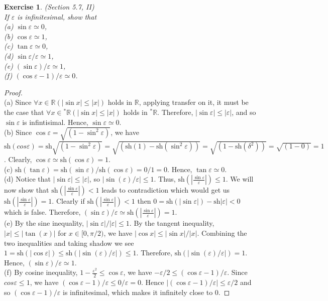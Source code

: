 \documentclass[a4paper, 11pt]{book}
\theoremstyle{plain}
\newtheorem{exercise}{Exercise}[chapter]
\theoremstyle{plain}
\newcommand{\R}{\mathbb{R}}
\newcommand{\ep}{\varepsilon}
\newcommand{\del}{\delta}
\newcommand{\hyp}{{}^*}
\newcommand{\sh}{\text{sh}}
\begin{document}
  \begin{exercise}
    (Section 5.7, II) \\
    If $\ep$ is infinitesimal, show that \\
    (a) $\sin \ep \simeq 0$, \\
    (b) $\cos \ep \simeq 1$, \\
    (c) $\tan \ep \simeq 0$, \\
    (d) $\sin \ep /\ep \simeq 1$, \\
    (e) $(\sin \ep)/\ep \simeq 1$,\\
    (f) $(\cos \ep -1)/\ep \simeq 0$.
  \end{exercise}
  \begin{proof} $ $ \\
    (a) Since $\forall x \in \R (|\sin x| \leq |x|)$ holds in $\R$, applying transfer on it, it must be the case that $\forall x \in \hyp \R (|\sin x| \leq |x|)$ holds in $\hyp \R$. Therefore, $|\sin \ep| \leq |\ep|$, and so $\sin \ep$ is infintisimal. Hence, $\sin \ep \simeq 0$. \\

    (b) Since $\cos \ep=\sqrt{(1-\sin^2 \ep)}$, we have $\sh (cos \ep)=\sh \sqrt{(1-\sin^2 \ep)}=\sqrt{(\sh(1)-\sh(\sin^2 \ep))}=\sqrt{(1-\sh(\del^2))}=\sqrt{(1-0)}=1$. Clearly, $\cos \ep \simeq \sh(\cos \ep)=1$. \\

    (c) $\sh (\tan \ep)=\sh(\sin \ep)/\sh( \cos \ep)=0/1=0$. Hence, $\tan \ep \simeq 0$. \\

    (d) Notice that $|\sin \ep| \leq |\ep|$, so $|\sin (\ep)/\ep| \leq 1$. Thus, $\sh \left( \left| \frac{\sin \ep}{\ep} \right| \right) \leq 1$. We will now show that $\sh \left( \left| \frac{\sin \ep}{\ep} \right| \right)<1$ leads to contradiction which would get us $\sh \left( \left| \frac{\sin \ep}{\ep} \right| \right)=1$. Clearly if $\sh \left( \left| \frac{\sin \ep}{\ep} \right| \right)<1$ then $0=\sh(|\sin \ep|)-\sh|\ep|<0$ which is false. Therefore, $(\sin \ep)/\ep \simeq \sh \left( \left| \frac{\sin \ep}{\ep} \right| \right)=1$. \\

    (e) By the sine inequality, $|\sin \ep|/|\ep| \leq 1$. By the tangent inequality, $|x| \leq |\tan (x)|$ for $x \in [0, \pi/2)$, we have $|\cos x|\leq |\sin x|/|x|$. Combining the two inequalities and taking shadow we see $1=\sh (|\cos \ep|) \leq \sh (|\sin(\ep)/\ep |) \leq 1$. Therefore, $\sh(|\sin(\ep)/\ep |)=1$. Hence, $(\sin \ep)/\ep \simeq 1$. \\

    (f) By cosine inequality, $1-\frac{\ep^2}{2} \leq \cos \ep$, we have $-\ep/2 \leq (\cos \ep -1)/\ep$. Since $cos \ep \leq 1$, we have $(\cos \ep -1)/\ep \leq 0/\ep=0$. Hence $|(\cos \ep-1)/\ep| \leq \ep/2$ and so $(\cos \ep-1)/\ep$ is infinitesimal, which makes it infinitely close to $0$.
  \end{proof}
\end{document}
